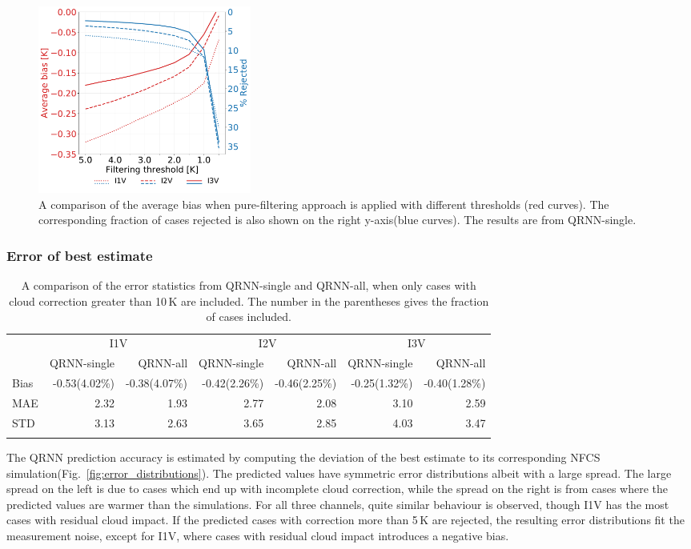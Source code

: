 \documentclass[amt, manuscript]{copernicus}
\begin{document}
\begin{figure}[t]
	\includegraphics[width=70mm]{Figures/different_filtering_thresholds.pdf} 
	\caption{A comparison of the  average bias when pure-filtering approach is applied with different thresholds (red curves). The corresponding fraction of cases rejected is also shown on the right y-axis(blue curves). The results are from QRNN-single. }
	\label{fig:filtering_thresholds}	
\end{figure} 

\subsubsection{Error of best estimate}  
%
\begin{table}[t]
	\caption{A comparison of the error statistics from QRNN-single and QRNN-all, when only cases with cloud correction greater than 10\,K are included. The number in the parentheses gives the fraction of cases included.}
	\label{tab:error_statistics_ici_high_cloud_impact}
	\begin{tabular}{lrr|rr|rr}
		\tophline
		&\multicolumn{2}{c|}{I1V}& \multicolumn{2}{c|}{I2V} & \multicolumn{2}{c}{I3V}\\
		\cline{2-7}
		&QRNN-single& QRNN-all & QRNN-single & QRNN-all  & QRNN-single & QRNN-all\\
		\middlehline
		Bias     & -0.53(4.02\%) & -0.38(4.07\%)  & -0.42(2.26\%) & -0.46(2.25\%) & -0.25(1.32\%) & -0.40(1.28\%) \\
		MAE      &  2.32 &  1.93  &  2.77 &  2.08 &  3.10 &  2.59 \\
		STD      &  3.13 &  2.63  &  3.65 &  2.85 &  4.03 &  3.47 \\
		\bottomhline
	\end{tabular}
	\belowtable{} %
\end{table}

The QRNN prediction accuracy is estimated by computing the deviation of the best estimate to its corresponding NFCS simulation(Fig.~\ref{fig:error_distributions}). The predicted values have symmetric error distributions albeit with a large spread. The large spread on the left is due to cases which end up with incomplete cloud correction, while the spread on the right is from cases where the predicted values are warmer than the simulations. For all three channels, quite similar behaviour is observed, though I1V has the most cases with residual cloud impact. If the predicted cases with correction more than 5\,K are rejected, the resulting error distributions fit the measurement noise, except for I1V, where cases with residual cloud impact introduces a negative bias. 
\end{document}
